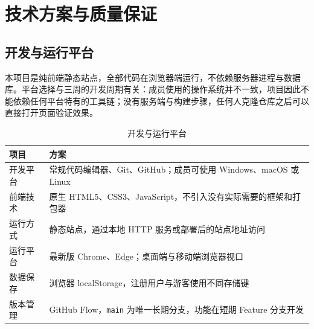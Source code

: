 %
%
%

\chapter{技术方案与质量保证}

\section{开发与运行平台}

本项目是纯前端静态站点，全部代码在浏览器端运行，不依赖服务器进程与数据库。平台选择与三周的开发周期有关：成员使用的操作系统并不一致，项目因此不能依赖任何平台特有的工具链；没有服务端与构建步骤，任何人克隆仓库之后可以直接打开页面验证效果。

\begin{table}[htbp]
\centering
\caption{开发与运行平台}
\small
\begin{tabularx}{\linewidth}{@{}l X@{}}
\toprule
项目 & 方案 \\
\midrule
开发平台 & 常规代码编辑器、Git、GitHub；成员可使用 Windows、macOS 或 Linux \\
前端技术 & 原生 HTML5、CSS3、JavaScript，不引入没有实际需要的框架和打包器 \\
运行方式 & 静态站点，通过本地 HTTP 服务或部署后的站点地址访问 \\
运行平台 & 最新版 Chrome、Edge；桌面端与移动端浏览器视口 \\
数据保存 & 浏览器 localStorage，注册用户与游客使用不同存储键 \\
版本管理 & GitHub Flow，\texttt{main} 为唯一长期分支，功能在短期 Feature 分支开发 \\
\bottomrule
\end{tabularx}
\end{table}

